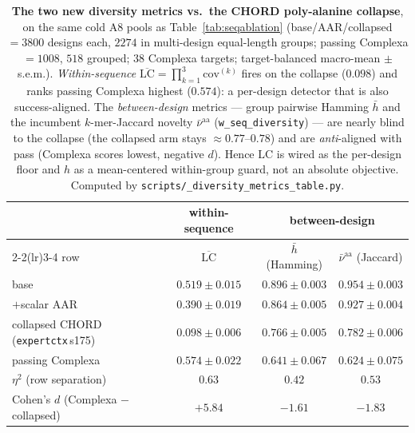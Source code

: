 \documentclass[11pt]{article}
\newcommand{\ttk}[1]{\texttt{\small #1}}
\begin{document}
\begin{table}[htbp]
\centering
\small
\begin{tabular}{lccc}
\toprule
 & \textbf{within-sequence} & \multicolumn{2}{c}{\textbf{between-design}} \\
\cmidrule(lr){2-2}\cmidrule(lr){3-4}
row & $\overline{\mathrm{LC}}$ & $\bar h$ (Hamming) & $\bar\nu^{\mathrm{aa}}$ (Jaccard) \\
\midrule
base                                    & $0.519\pm0.015$          & $0.896\pm0.003$ & $0.954\pm0.003$ \\
$+$scalar AAR                           & $0.390\pm0.019$          & $0.864\pm0.005$ & $0.927\pm0.004$ \\
collapsed CHORD (\ttk{expertctx}\,s175) & $\mathbf{0.098\pm0.006}$ & $0.766\pm0.005$ & $0.782\pm0.006$ \\
passing Complexa                        & $\mathbf{0.574\pm0.022}$ & $0.641\pm0.067$ & $0.624\pm0.075$ \\
\midrule
$\eta^2$ (row separation)               & $0.63$  & $0.42$  & $0.53$  \\
Cohen's $d$ (Complexa $-$ collapsed)    & $+5.84$ & $-1.61$ & $-1.83$ \\
\bottomrule
\end{tabular}
\caption{\textbf{The two new diversity metrics vs.\ the CHORD poly-alanine collapse}, on the same cold
A8 pools as Table~\ref{tab:seqablation} (base/AAR/collapsed $=3800$ designs each, $2274$ in multi-design
equal-length groups; passing Complexa $=1008$, $518$ grouped; $38$ Complexa targets; target-balanced
macro-mean $\pm$ s.e.m.). \emph{Within-sequence} $\overline{\mathrm{LC}}{=}\prod_{k=1}^{3}\mathrm{cov}^{(k)}$
fires on the collapse ($0.098$) and ranks passing Complexa highest ($0.574$): a per-design detector that
is also success-aligned. The \emph{between-design} metrics --- group pairwise Hamming $\bar h$ and the
incumbent $k$-mer-Jaccard novelty $\bar\nu^{\mathrm{aa}}$ (\ttk{w\_seq\_diversity}) --- are nearly blind
to the collapse (the collapsed arm stays $\approx\!0.77$--$0.78$) and are \emph{anti}-aligned with pass
(Complexa scores lowest, negative $d$). Hence $\mathrm{LC}$ is wired as the per-design floor and $h$ as a
mean-centered within-group guard, not an absolute objective. Computed by
\ttk{scripts/\_diversity\_metrics\_table.py}.}
\label{tab:diversitymetrics}
\end{table}
\end{document}

